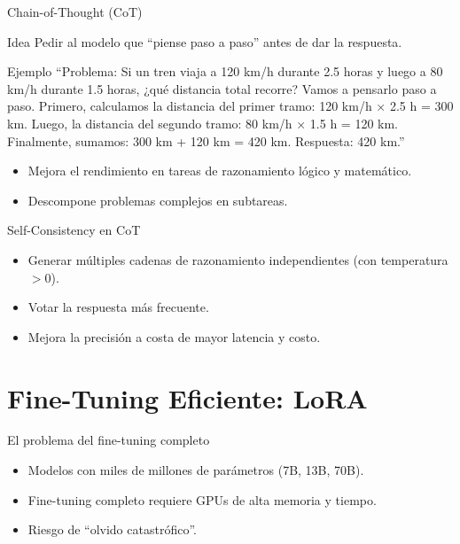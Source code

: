 \documentclass[aspectratio=169, 10pt, xcolor=table]{beamer}
\begin{document}
\begin{frame}{Chain-of-Thought (CoT)}
    \begin{block}{Idea}
        Pedir al modelo que ``piense paso a paso'' antes de dar la respuesta.
    \end{block}
    \begin{exampleblock}{Ejemplo}
        ``Problema: Si un tren viaja a 120 km/h durante 2.5 horas y luego a 80 km/h durante 1.5 horas, ¿qué distancia total recorre? Vamos a pensarlo paso a paso. Primero, calculamos la distancia del primer tramo: 120 km/h × 2.5 h = 300 km. Luego, la distancia del segundo tramo: 80 km/h × 1.5 h = 120 km. Finalmente, sumamos: 300 km + 120 km = 420 km. Respuesta: 420 km.''
    \end{exampleblock}
    \begin{itemize}
        \item Mejora el rendimiento en tareas de razonamiento lógico y matemático.
        \item Descompone problemas complejos en subtareas.
    \end{itemize}
\end{frame}

\begin{frame}{Self-Consistency en CoT}
    \begin{itemize}
        \item Generar múltiples cadenas de razonamiento independientes (con temperatura $>0$).
        \item Votar la respuesta más frecuente.
        \item Mejora la precisión a costa de mayor latencia y costo.
    \end{itemize}
\end{frame}

\section{Fine-Tuning Eficiente: LoRA}

\begin{frame}{El problema del fine-tuning completo}
    \begin{itemize}
        \item Modelos con miles de millones de parámetros (7B, 13B, 70B).
        \item Fine-tuning completo requiere GPUs de alta memoria y tiempo.
        \item Riesgo de ``olvido catastrófico''.
    \end{itemize}
\end{frame}
\end{document}
